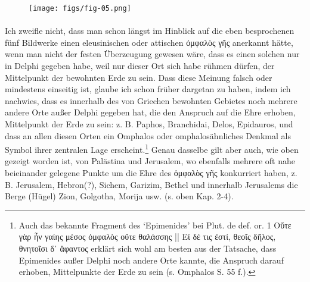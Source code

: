 \documentclass[a4paper, 11pt, oneside]{article}
\begin{document}
\begin{figure}[H]
\centering
\texttt{[image: figs/fig-05.png]}
\caption{}
\end{figure}
\paragraph{}
Ich zweifle nicht, dass man schon längst im Hinblick auf die eben besprochenen fünf Bildwerke einen eleusinischen oder attischen ὀμφαλὸς γῆς anerkannt hätte, wenn man nicht der festen Überzeugung gewesen wäre, dass es einen solchen nur in Delphi gegeben habe, weil nur dieser Ort sich habe rühmen dürfen, der Mittelpunkt der bewohnten Erde zu sein. Dass diese Meinung falsch oder mindestens einseitig ist, glaube ich schon früher dargetan zu haben, indem ich nachwies, dass es innerhalb des von Griechen bewohnten Gebietes noch mehrere andere Orte außer Delphi gegeben hat, die den Anspruch auf die Ehre erhoben, Mittelpunkt der Erde zu sein: z. B. Paphos, Branchidai, Delos, Epidauros, und dass an allen diesen Orten ein Omphalos oder omphalosähnliches Denkmal als Symbol ihrer zentralen Lage erscheint.\footnote{Auch das bekannte Fragment des `Epimenides' bei Plut. de def. or. 1 Οὔτε γὰρ ἦν γαίης μέσος ὀμφαλὸς οὔτε θαλάσσης || Εἰ δέ τις ἐστί, θεοῖς δῆλος, θνητοῖσι δ᾽ ἄφαντος erklärt sich wohl am besten aus der Tatsache, dass Epimenides außer Delphi noch andere Orte kannte, die Anspruch darauf erhoben, Mittelpunkte der Erde zu sein (s. Omphalos S. 55 f.).} Genau dasselbe gilt aber auch, wie oben gezeigt worden ist, von Palästina und Jerusalem, wo ebenfalls mehrere oft nahe beieinander gelegene Punkte um die Ehre des ὀμφαλὸς γῆς konkurriert haben, z. B. Jerusalem, Hebron(?), Sichem, Garizim, Bethel und innerhalb Jerusalems die Berge (Hügel) Zion, Golgotha, Morija usw. (s. oben Kap. 2-4).
\end{document}
